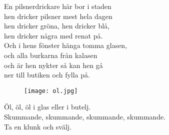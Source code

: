 \documentclass[a6paper, 10pt, twoside]{article}
\begin{document}
\begin{center}
\end{center}
\begin{lyrics}
En pilsnerdrickare här bor i staden\\
hen dricker pilsner mest hela dagen\\
hen dricker gröna, hen dricker blå,\\
hen dricker några med renat på.\\
Och i hens fönster hänga tomma glasen,\\
och alla burkarna från kalasen\\
och är hen nykter så kan hen gå\\
ner till butiken och fylla på.
\end{lyrics}
\begin{figure}[!h]
\hspace{30pt}\texttt{[image: ol.jpg]}
\end{figure}
\begin{center}
\end{center}
\begin{lyrics}
Öl, öl, öl i glas eller i butelj.\\
Skummande, skummande, skummande, skummande.\\
Ta en klunk och svälj.
\end{lyrics}
\end{document}
